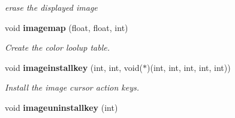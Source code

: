 \begin{CompactItemize}
\begin{CompactList}\small\item\em erase the displayed image \item\end{CompactList}\item 
void {\bf imagemap} (float, float, int)
\begin{CompactList}\small\item\em Create the color loolup table. \item\end{CompactList}\item 
void {\bf imageinstallkey} (int, int, void($\ast$)(int, int, int, int, int))
\begin{CompactList}\small\item\em Install the image cursor action keys. \item\end{CompactList}\item 
void {\bf imageuninstallkey} (int)\label{xtv_8h_a68}


\end{CompactItemize}
